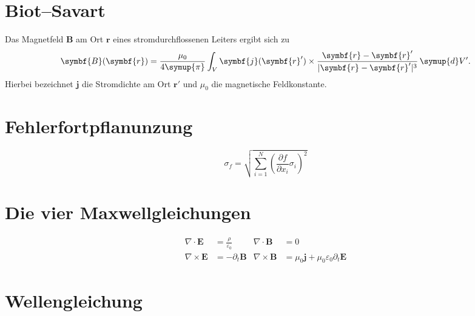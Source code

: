\documentclass{scrartcl}
\begin{document}
\section{Biot--Savart}

Das Magnetfeld $\symbf{B}$ am Ort $\symbf{r}$ eines stromdurchflossenen Leiters ergibt sich zu
\begin{equation}
  \symbf{B}(\symbf{r}) = \frac{\mu_0}{4 \symup{\pi}}
    \int_V \symbf{j}(\symbf{r}') \times \frac{\symbf{r} - \symbf{r}'}{\lvert \symbf{r} - \symbf{r}' \rvert^3} \, \symup{d}V' .
\end{equation}
Hierbei bezeichnet $\symbf{j}$ die Stromdichte am Ort $\symbf{r}'$ und $\mu_0$ die magnetische Feldkonstante.

\section{Fehlerfortpflanunzung}

\begin{equation}
  \sigma_f = \sqrt{
    \sum\limits_{i = 1}^N
      \left( \frac{\partial f}{\partial x_i} \sigma_i \right)^{\!\! 2}
  }
\end{equation}

\section{Die vier Maxwellgleichungen}

\begin{align}
  \nabla \cdot  \symbf{E} &= \frac{\rho}{\varepsilon_0} &
  \nabla \cdot  \symbf{B} &= 0 \\
  \nabla \times \symbf{E} &= - \partial_t \symbf{B} &
  \nabla \times \symbf{B} &= \mu_0 \symbf{j} + \mu_0 \varepsilon_0 \partial_t \symbf{E}
\end{align}

\section{Wellengleichung}
\end{document}
